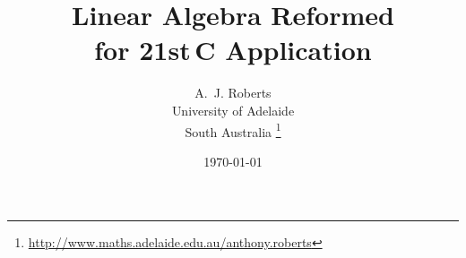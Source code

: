 \documentclass[10pt,a5paper,smallborder,twoside]{refrep}
\title{Linear Algebra Reformed
\\for 21st\,C Application}
\author{A.~J. Roberts
\\University of Adelaide
\\South Australia
\thanks{\url{http://www.maths.adelaide.edu.au/anthony.roberts}}}
\date{\today\titlePageInfo}
\begin{document}


\tableofcontents








\makeanswers





\makeanswers








\makeanswers




\makeanswers




\makeanswers




\makeanswers





\makeanswers






\end{document}
